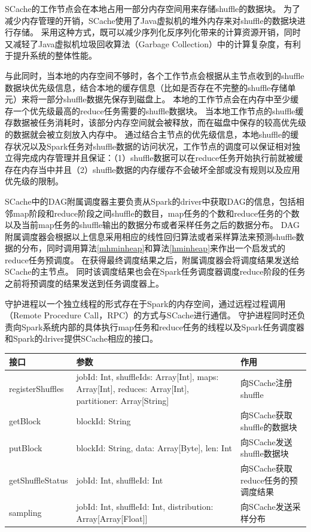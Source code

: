SCache的工作节点会在本地占用一部分内存空间用来存储shuffle的数据块。
为了减少内存管理的开销，SCache使用了Java虚拟机的堆外内存来对shuffle的数据块进行存储。
采用这种方式，既可以减少序列化反序列化带来的计算资源开销，同时又减轻了Java虚拟机垃圾回收算法（Garbage Collection）中的计算复杂度，有利于提升系统的整体性能。

与此同时，当本地的内存空间不够时，各个工作节点会根据从主节点收到的shuffle数据块优先级信息，结合本地的缓存信息（比如是否存在不完整的shuffle存储单元）来将一部分shuffle数据先保存到磁盘上。
本地的工作节点会在内存中至少缓存一个优先级最高的reduce任务需要的shuffle数据块。
当本地工作节点的shuffle缓存数据被任务消耗时，该部分内存空间就会被释放，而在磁盘中保存的较高优先级的数据就会被立刻放入内存中。
通过结合主节点的优先级信息，本地shuffle的缓存状况以及Spark任务对shuffle数据的访问状况，工作节点的调度可以保证相对独立得完成内存管理并且保证：（1）shuffle数据可以在reduce任务开始执行前就被缓存在内存当中并且（2）shuffle数据的内存缓存不会破坏全部或没有规则以及应用优先级的限制。

SCache中的DAG附属调度器主要负责从Spark的driver中获取DAG的信息，包括相邻map阶段和reduce阶段之间shuffle的数目，map任务的个数和reduce任务的个数以及当前map任务的shuffle输出的数据分布或者采样任务之后的数据分布。
DAG附属调度器会根据以上信息采用相应的线性回归算法或者采样算法来预测shuffle数据的分布，同时调用算法\ref{mhminheap}和算法\ref{hminheap}来作出一个启发式的reduce任务预调度。
在获得最终调度结果之后，附属调度器会将调度结果发送给SCache的主节点。
同时该调度结果也会在Spark任务调度器调度reduce阶段的任务之前将预调度的结果发送到任务调度器上。

守护进程以一个独立线程的形式存在于Spark的内存空间，通过远程过程调用（Remote Procedure Call，RPC）的方式与SCache进行通信。
守护进程同时还负责向Spark系统内部的具体执行map任务和reduce任务的线程以及Spark任务调度器和Spark的driver提供SCache相应的接口。

\begin{table}[!hpb]
    \centering
    \begin{tabular}{ | m{2.5cm} | m{9cm} | m{3.6cm} | }
        \hline
        接口 & 参数 & 作用 \\ [0.5ex]
        \hline
        \hline
        registerShuffles & jobId: Int, shuffleIds: Array[Int], maps: Array[Int], reduces: Array[Int], partitioner: Array[String] & 向SCache注册shuffle \\ \hline
        getBlock & blockId: String & 向SCache获取shuffle的数据块 \\ \hline
        putBlock & blockId: String, data: Array[Byte], len: Int & 向SCache发送shuffle数据块 \\ \hline
        getShuffleStatus & jobId: Int, shuffleId: Int & 向SCache获取reduce任务的预调度结果 \\ \hline
        sampling & jobId: Int, shuffleId: Int, distribution: Array[Array[Float]] & 向SCache发送采样分布 \\ 
        \hline
    \end{tabular}
\end{table}

